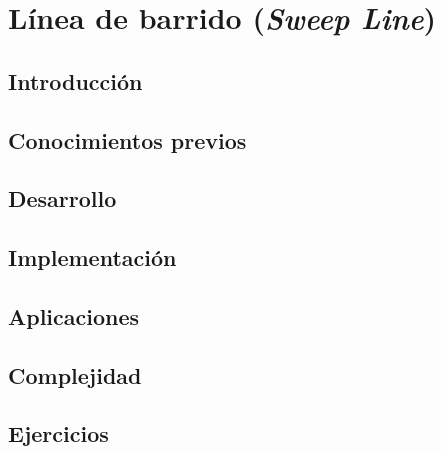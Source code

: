 \chapter{Línea de barrido (\emph{Sweep Line})}
\section{Introducción}

\section{Conocimientos previos}

\section{Desarrollo}

\section{Implementación}

\section{Aplicaciones}

\section{Complejidad}

\section{Ejercicios}

%
